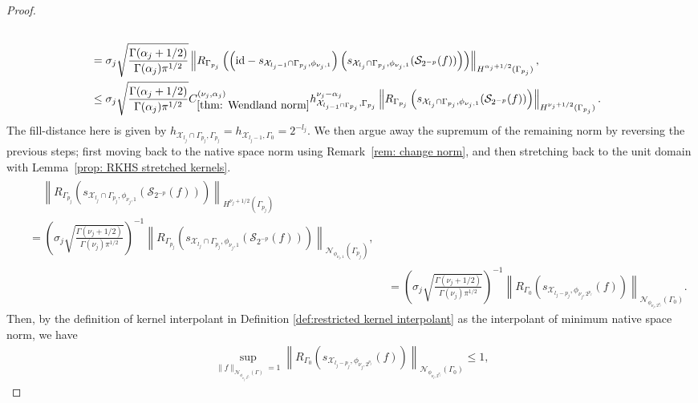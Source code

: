 \documentclass[pdflatex,sn-mathphys-num]{sn-jnl}%
\theoremstyle{thmstyleone}%
\theoremstyle{thmstyletwo}%
\theoremstyle{thmstylethree}%
\begin{document}
\begin{proof}
\begin{align}
\begin{split}
        \end{split}\nonumber\\
        &=\sigma_j\sqrt{\frac{\Gamma(\alpha_j+1/2)}{\Gamma(\alpha_j)\pi^{1/2}}}\left\|R_{\Gamma_{p_j}}\left(\left(\textup{id}-s_{\mathcal{X}_{l_j-1}\cap\Gamma_{p_j},\phi_{\nu_j,1}}\right)\left(s_{\mathcal{X}_{l_j}\cap\Gamma_{p_j},\phi_{\nu_j,1}}(\mathcal{S}_{2^{-p}}(f))\right)\right)\right\|_{H^{\alpha_j+1/2}(\Gamma_{p_j})},\nonumber\\
        &\leq\sigma_j\sqrt{\frac{\Gamma(\alpha_j+1/2)}{\Gamma(\alpha_j)\pi^{1/2}}}C^{(\nu_j,\alpha_j)}_{\ref{thm: Wendland norm}}h^{\nu_j-\alpha_j}_{\mathcal{X}_{l_{j-1}\cap\Gamma_{p_j}},\Gamma_{p_j}}\left\|R_{\Gamma_{p_j}}\left(s_{\mathcal{X}_{l_j}\cap\Gamma_{p_j},\phi_{\nu_j,1}}(\mathcal{S}_{2^{-p}}(f))\right)\right\|_{H^{\nu_j+1/2}(\Gamma_{p_j})}.\label{eq: 1stcase pause 3}
    \end{align}
    The fill-distance here is given by \(h_{\mathcal{X}_{l_j}\cap\Gamma_{p_j},\Gamma_{p_j}}=h_{\mathcal{X}_{l_j-1},\Gamma_0}=2^{-l_j}\). We then argue away the supremum of the remaining norm by reversing the previous steps; first moving back to the native space norm using Remark~\ref{rem: change norm}, and then stretching back to the unit domain with Lemma~\ref{prop: RKHS stretched kernels}.
    \begin{align}
        \begin{split}
        &\quad\,\left\|R_{\Gamma_{p_j}}\left(s_{\mathcal{X}_{l_j}\cap\Gamma_{p_j},\phi_{\nu_j,1}}(\mathcal{S}_{2^{-p}}(f))\right)\right\|_{H^{\nu_j+1/2}(\Gamma_{p_j})}\\
        &=\left(\sigma_j\sqrt{\frac{\Gamma(\nu_j+1/2)}{\Gamma(\nu_j)\pi^{1/2}}}\right)^{-1}\left\|R_{\Gamma_{p_j}}\left(s_{\mathcal{X}_{l_j}\cap\Gamma_{p_j},\phi_{\nu_j,1}}(\mathcal{S}_{2^{-p}}(f))\right)\right\|_{\mathcal{N}_{\phi_{\nu_j,1}}(\Gamma_{p_j})},
        \end{split}\nonumber\\
        &=\left(\sigma_j\sqrt{\frac{\Gamma(\nu_j+1/2)}{\Gamma(\nu_j)\pi^{1/2}}}\right)^{-1}\left\|R_{\Gamma_{0}}\left(s_{\mathcal{X}_{l_j-p_j},\phi_{\nu_j,2^{p_j}}}(f)\right)\right\|_{\mathcal{N}_{\phi_{\nu_j,2^{p_j}}}(\Gamma_{0})}.\nonumber
    \end{align}
    Then, by the definition of kernel interpolant in Definition \ref{def:restricted kernel interpolant} as the interpolant of minimum native space norm, we have
    \begin{align}
        \sup_{\|f\|_{\mathcal{N}_{\phi_{\nu_j,2^{p_j}}}(\Gamma)}=1}\left\|R_{\Gamma_{0}}\left(s_{\mathcal{X}_{l_j-p_j},\phi_{\nu_j,2^{p_j}}}(f)\right)\right\|_{\mathcal{N}_{\phi_{\nu_j,2^{p_j}}}(\Gamma_{0})}\leq 1,\label{eq: 1st case end}

\end{align}
\end{proof}
\end{document}
